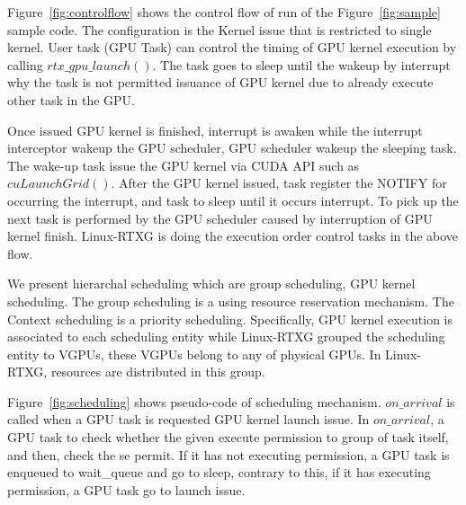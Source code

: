 Figure~\ref{fig:controlflow} shows the control flow of run of the Figure~\ref{fig:sample} sample code.
The configuration is the Kernel issue that is restricted to single kernel.
User task (GPU Task) can control the timing of GPU kernel execution by calling $rtx\_gpu\_launch()$.
The task goes to sleep until the wakeup by interrupt why the task is not permitted issuance of GPU kernel due to already execute other task in the GPU.

Once issued GPU kernel is finished,
interrupt is awaken while the interrupt interceptor wakeup the GPU scheduler, GPU scheduler wakeup the sleeping task. 
The wake-up task issue the GPU kernel via CUDA API such as $cuLaunchGrid()$.
After the GPU kernel issued, task register the NOTIFY for occurring the interrupt,
and task to sleep until it occurs interrupt.
To pick up the next task is performed by the GPU scheduler caused by interruption of GPU kernel finish.
Linux-RTXG is doing the execution order control tasks in the above flow.

We present hierarchal scheduling which are group scheduling, GPU kernel scheduling.
The group scheduling is a using resource reservation mechanism.
The Context scheduling is a priority scheduling.
Specifically, GPU kernel execution is associated to each scheduling entity while Linux-RTXG grouped the scheduling entity to VGPUs, these VGPUs belong to any of physical GPUs.
In Linux-RTXG, resources are distributed in this group.

Figure~\ref{fig:scheduling} shows pseudo-code of scheduling mechanism.
$on\_arrival$ is called when a GPU task is requested GPU kernel launch issue.
In $on\_arrival$, a GPU task to check whether the given execute permission to group of task itself, and then, check the se permit.
If it has not executing permission, a GPU task is enqueued to wait\_queue and go to sleep,
contrary to this, if it has executing permission, a GPU task go to launch issue.

